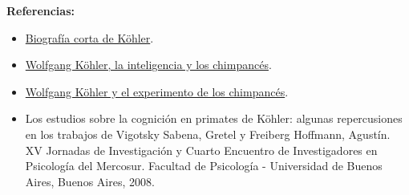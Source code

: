 \documentclass[12pt]{article}
\theoremstyle{largebreak}
\begin{document}
    \newpage

    \textbf{Referencias:}

    \begin{itemize}
        \item \href{https://www.ufrgs.br/psicoeduc/chasqueweb/gestalt/biografias-gestalt.htm}{Biografía corta de Köhler}.
        \item \href{https://lamenteesmaravillosa.com/wolfgang-kohler-la-inteligencia-y-los-chimpances/}{Wolfgang Köhler, la inteligencia y los chimpancés}.
        \item \href{https://neuro-class.com/wolfgang-kohler-y-el-experimento-de-los-chimpances/}{Wolfgang Köhler y el experimento de los chimpancés}.
        \item Los estudios sobre la cognición en primates de Köhler: algunas repercusiones en los trabajos de Vigotsky
        Sabena, Gretel y Freiberg Hoffmann, Agustín.
        XV Jornadas de Investigación y Cuarto Encuentro de Investigadores en Psicología del Mercosur. Facultad de Psicología - Universidad de Buenos Aires, Buenos Aires, 2008.
    \end{itemize}

    
\end{document}
